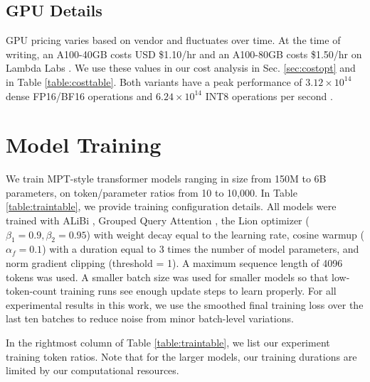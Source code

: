 \subsection{GPU Details}\label{sec:pricing}
GPU pricing varies based on vendor and fluctuates over time. At the time of writing, an A100-40GB costs USD \$1.10/hr and an A100-80GB costs \$1.50/hr on Lambda Labs \cite{lambdalabs}. We use these values in our cost analysis in Sec. \ref{sec:costopt} and in Table \ref{table:costtable}. Both variants have a peak performance of $3.12 \times 10^{14}$ dense FP16/BF16 operations and  $6.24 \times 10^{14}$ INT8 operations per second \cite{a100datasheet}.

\section{Model Training}\label{sec:traindetails}
We train MPT-style transformer models \cite{mpt} ranging in size from 150M to 6B parameters, on token/parameter ratios from 10 to 10,000. In Table \ref{table:traintable}, we provide training configuration details. All models were trained with ALiBi \cite{alibi}, Grouped Query Attention \cite{gqa}, the Lion optimizer \cite{lion} ($\beta_1 = 0.9, \beta_2 = 0.95$) with weight decay equal to the learning rate, cosine warmup ($\alpha_f = 0.1$) with a duration equal to 3 times the number of model parameters, and norm gradient clipping (threshold = 1). A maximum sequence length of 4096 tokens was used. 
A smaller batch size was used for smaller models so that low-token-count training runs see enough update steps to learn properly. For all experimental results in this work, we use the smoothed final training loss over the last ten batches to reduce noise from minor batch-level variations.

In the rightmost column of Table \ref{table:traintable}, we list our experiment training token ratios. Note that for the larger models, our training durations are limited by our computational resources.

